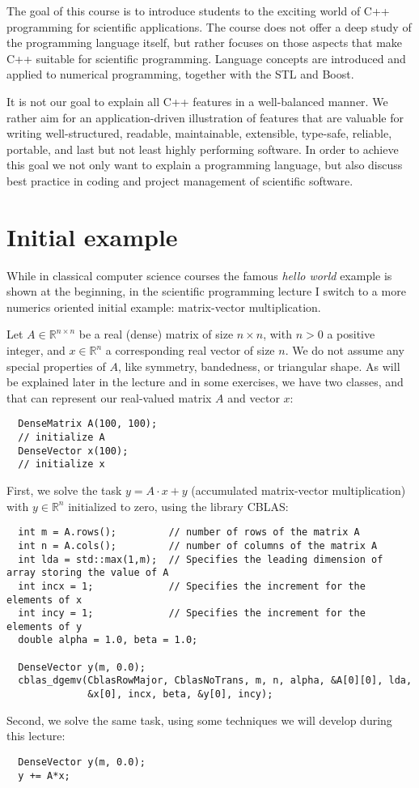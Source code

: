 The goal of this course is to introduce students to the exciting world of C++ programming for scientific applications. The course
does not offer a deep study of the programming language itself, but rather focuses on those aspects that make C++ suitable for
scientific programming. Language concepts are introduced and applied to numerical programming, together with the STL and Boost.

It is not our goal to explain all C++ features in a well-balanced manner. We rather aim for an application-driven illustration of
features that are valuable for writing well-structured, readable, maintainable, extensible, type-safe, reliable, portable, and last
but not least highly performing software. In order to achieve this goal we not only want to explain a programming language, but
also discuss best practice in coding and project management of scientific software.

\section{Initial example}
While in classical computer science courses the famous \emph{hello world} example is shown at the beginning, in the scientific
programming lecture I switch to a more numerics oriented initial example: matrix-vector multiplication.

Let $A\in\mathbb{R}^{n\times n}$ be a real (dense) matrix of size $n\times n$, with $n > 0$ a positive integer, and $x\in\mathbb{R}^n$
a corresponding real vector of size $n$. We do not assume any special properties of $A$, like symmetry, bandedness, or triangular
shape. As will be explained later in the lecture and in some exercises, we have two classes,  and 
that can represent our real-valued matrix $A$ and vector $x$:
%
\begin{verbatim}
  DenseMatrix A(100, 100);
  // initialize A
  DenseVector x(100);
  // initialize x
\end{verbatim}

First, we solve the task $y = A\cdot x + y$ (accumulated matrix-vector multiplication) with $y\in\mathbb{R}^n$ initialized to zero,
using the library CBLAS:
%
\begin{verbatim}
  int m = A.rows();         // number of rows of the matrix A
  int n = A.cols();         // number of columns of the matrix A
  int lda = std::max(1,m);  // Specifies the leading dimension of array storing the value of A
  int incx = 1;             // Specifies the increment for the elements of x
  int incy = 1;             // Specifies the increment for the elements of y
  double alpha = 1.0, beta = 1.0;

  DenseVector y(m, 0.0);
  cblas_dgemv(CblasRowMajor, CblasNoTrans, m, n, alpha, &A[0][0], lda,
              &x[0], incx, beta, &y[0], incy);
\end{verbatim}
%
Second, we solve the same task, using some techniques we will develop during this lecture:
%
\begin{verbatim}
  DenseVector y(m, 0.0);
  y += A*x;
\end{verbatim}

